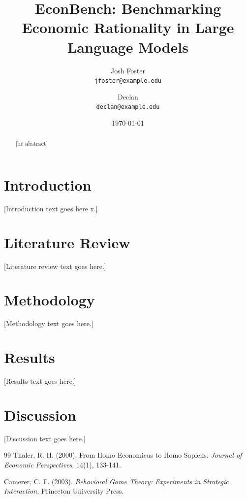 \documentclass[11pt, letterpaper]{article}
\title{\textbf{EconBench: Benchmarking Economic Rationality in Large Language Models}}
\author{
  Josh Foster \\
  \texttt{jfoster@example.edu}
  \and
  Declan \\
  \texttt{declan@example.edu}
}
\date{\today}
\begin{document}
\maketitle

\begin{abstract}
  [be abstract]
\end{abstract}

\section{Introduction}
[Introduction text goes here x.]

\section{Literature Review}
[Literature review text goes here.]

\section{Methodology}
[Methodology text goes here.]

\section{Results}
[Results text goes here.]

\section{Discussion}
[Discussion text goes here.]

\begin{thebibliography}{99}
  Thaler, R. H. (2000). From Homo Economicus to Homo Sapiens. \textit{Journal of Economic Perspectives}, 14(1), 133-141.

  Camerer, C. F. (2003). \textit{Behavioral Game Theory: Experiments in Strategic Interaction}. Princeton University Press.
\end{thebibliography}
\end{document}
